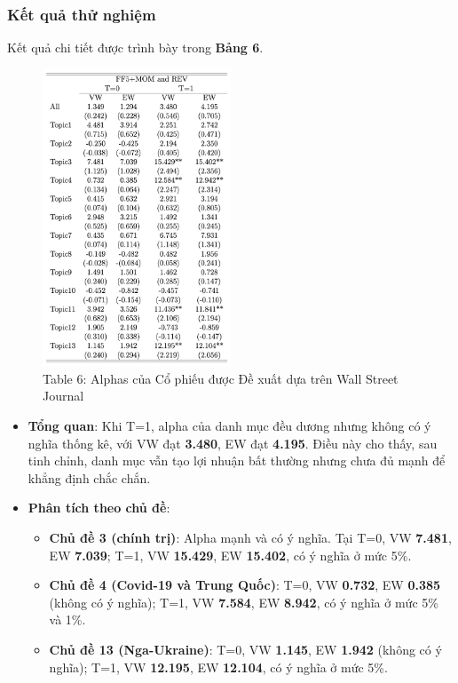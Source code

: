 \documentclass[a4paper,12pt]{article}
\begin{document}
\subsubsection{Kết quả thử nghiệm}
Kết quả chi tiết được trình bày trong \textbf{Bảng 6}.
\begin{figure}[H]
    \centering
    \includegraphics[width=0.5\textwidth]{table/tab6.png}
    \caption*{Table 6: Alphas của Cổ phiếu được Đề xuất dựa trên Wall Street Journal}
    \label{fig:fig2}
\end{figure}
\begin{itemize}
    \item \textbf{Tổng quan}: Khi T=1, alpha của danh mục đều dương nhưng không có ý nghĩa thống kê, với VW đạt \textbf{3.480}, EW đạt \textbf{4.195}. Điều này cho thấy, sau tinh chỉnh, danh mục vẫn tạo lợi nhuận bất thường nhưng chưa đủ mạnh để khẳng định chắc chắn.
    \item \textbf{Phân tích theo chủ đề}:
    \begin{itemize}
        \item \textbf{Chủ đề 3 (chính trị)}: Alpha mạnh và có ý nghĩa. Tại T=0, VW \textbf{7.481}, EW \textbf{7.039}; T=1, VW \textbf{15.429}, EW \textbf{15.402}, có ý nghĩa ở mức 5\%.
        \item \textbf{Chủ đề 4 (Covid-19 và Trung Quốc)}: T=0, VW \textbf{0.732}, EW \textbf{0.385} (không có ý nghĩa); T=1, VW \textbf{7.584}, EW \textbf{8.942}, có ý nghĩa ở mức 5\% và 1\%.
        \item \textbf{Chủ đề 13 (Nga-Ukraine)}: T=0, VW \textbf{1.145}, EW \textbf{1.942} (không có ý nghĩa); T=1, VW \textbf{12.195}, EW \textbf{12.104}, có ý nghĩa ở mức 5\%.
    \end{itemize}
\end{itemize}
\end{document}
